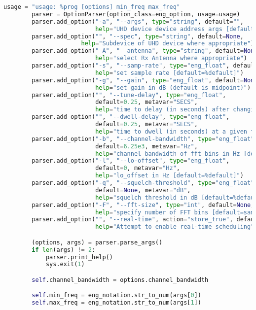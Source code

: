 \begin{lstlisting}[language=Python]
        usage = "usage: %prog [options] min_freq max_freq"
        parser = OptionParser(option_class=eng_option, usage=usage)
        parser.add_option("-a", "--args", type="string", default="",
                          help="UHD device device address args [default=%default]")
        parser.add_option("", "--spec", type="string", default=None,
                      help="Subdevice of UHD device where appropriate")
        parser.add_option("-A", "--antenna", type="string", default=None,
                          help="select Rx Antenna where appropriate")
        parser.add_option("-s", "--samp-rate", type="eng_float", default=1e6,
                          help="set sample rate [default=%default]")
        parser.add_option("-g", "--gain", type="eng_float", default=None,
                          help="set gain in dB (default is midpoint)")
        parser.add_option("", "--tune-delay", type="eng_float",
                          default=0.25, metavar="SECS",
                          help="time to delay (in seconds) after changing frequency [default=%default]")
        parser.add_option("", "--dwell-delay", type="eng_float",
                          default=0.25, metavar="SECS",
                          help="time to dwell (in seconds) at a given frequency [default=%default]")
        parser.add_option("-b", "--channel-bandwidth", type="eng_float",
                          default=6.25e3, metavar="Hz",
                          help="channel bandwidth of fft bins in Hz [default=%default]")
        parser.add_option("-l", "--lo-offset", type="eng_float",
                          default=0, metavar="Hz",
                          help="lo_offset in Hz [default=%default]")
        parser.add_option("-q", "--squelch-threshold", type="eng_float",
                          default=None, metavar="dB",
                          help="squelch threshold in dB [default=%default]")
        parser.add_option("-F", "--fft-size", type="int", default=None,
                          help="specify number of FFT bins [default=samp_rate/channel_bw]")
        parser.add_option("", "--real-time", action="store_true", default=False,
                          help="Attempt to enable real-time scheduling")

        (options, args) = parser.parse_args()
        if len(args) != 2:
            parser.print_help()
            sys.exit(1)

        self.channel_bandwidth = options.channel_bandwidth

        self.min_freq = eng_notation.str_to_num(args[0])
        self.max_freq = eng_notation.str_to_num(args[1])


\end{lstlisting}
